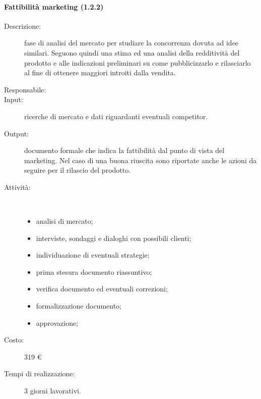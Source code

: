 \paragraph{Fattibilit\`{a} marketing (1.2.2)}
\begin{description}
\item[Descrizione:] fase di analisi del mercato per studiare la concorrenza dovuta ad idee similari. Seguono quindi una stima ed una analisi della redditivit\`{a} del prodotto e alle indicazioni preliminari su come pubblicizzarlo e rilasciarlo al fine di ottenere maggiori introiti dalla vendita.
\item[Responsabile:] 
\item[Input:] ricerche di mercato e dati riguardanti eventuali competitor.
\item[Output:] documento formale che indica la fattibilità dal punto di vista del marketing. Nel caso di una buona riuscita sono riportate anche le azioni da seguire per il rilascio del prodotto.
\item[Attività:]\mbox{}\\[-1.5\baselineskip]
	\begin{itemize}
	\item analisi di mercato;
	\item interviste, sondaggi e dialoghi con possibili clienti;
	\item individuazione di eventuali strategie;
	\item prima stesura documento riassuntivo;
	\item verifica documento ed eventuali correzioni;
	\item formalizzazione documento;
	\item approvazione;
	\end{itemize}

\item[Costo:] 319 \euro{}
\item[Tempi di realizzazione:] 3 giorni lavorativi.
\end{description}
